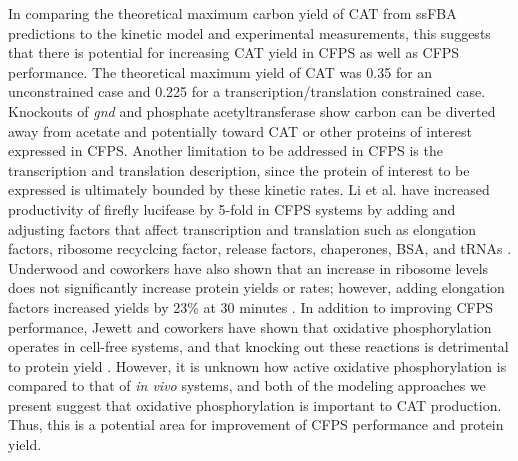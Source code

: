 \documentclass[12pt]{article}
\begin{document}
In comparing the theoretical maximum carbon yield of CAT from ssFBA predictions to the kinetic model and experimental measurements, this suggests that there is potential for increasing CAT yield in CFPS as well as CFPS performance.
The theoretical maximum yield of CAT was 0.35 for an unconstrained case and 0.225 for a transcription/translation constrained case.
Knockouts of \textit{gnd} and phosphate acetyltransferase show carbon can be diverted away from acetate and potentially toward CAT or other proteins of interest expressed in CFPS.
Another limitation to be addressed in CFPS is the transcription and translation description, since the protein of interest to be expressed is ultimately bounded by these kinetic rates.
Li et al. have increased productivity of firefly lucifease by 5-fold in CFPS systems by adding and adjusting factors that affect transcription and translation such as elongation factors, ribosome recyclcing factor, release factors, chaperones, BSA, and tRNAs \cite{2014_li_PlosOne}.
Underwood and coworkers have also shown that an increase in ribosome levels does not significantly increase protein yields or rates; however, adding elongation factors increased yields by 23\% at 30 minutes \cite{2005_underwood_biotech}.
In addition to improving CFPS performance, Jewett and coworkers have shown that oxidative phosphorylation operates in cell-free systems, and that knocking out these reactions is detrimental to protein yield \cite{2008_jewett_molsysbiol}.
However, it is unknown how active oxidative phosphorylation is compared to that of \textit{in vivo} systems, and both of the modeling approaches we present suggest that oxidative phosphorylation is important to CAT production.
Thus, this is a potential area for improvement of CFPS performance and protein yield.

\end{document}
